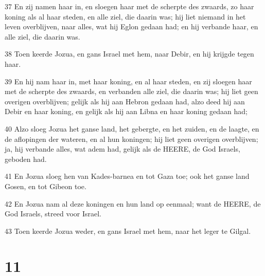 \par 37 En zij namen haar in, en sloegen haar met de scherpte des zwaards, zo haar koning als al haar steden, en alle ziel, die daarin was; hij liet niemand in het leven overblijven, naar alles, wat hij Eglon gedaan had; en hij verbande haar, en alle ziel, die daarin was.
\par 38 Toen keerde Jozua, en gans Israel met hem, naar Debir, en hij krijgde tegen haar.
\par 39 En hij nam haar in, met haar koning, en al haar steden, en zij sloegen haar met de scherpte des zwaards, en verbanden alle ziel, die daarin was; hij liet geen overigen overblijven; gelijk als hij aan Hebron gedaan had, alzo deed hij aan Debir en haar koning, en gelijk als hij aan Libna en haar koning gedaan had;
\par 40 Alzo sloeg Jozua het ganse land, het gebergte, en het zuiden, en de laagte, en de aflopingen der wateren, en al hun koningen; hij liet geen overigen overblijven; ja, hij verbande alles, wat adem had, gelijk als de HEERE, de God Israels, geboden had.
\par 41 En Jozua sloeg hen van Kades-barnea en tot Gaza toe; ook het ganse land Gosen, en tot Gibeon toe.
\par 42 En Jozua nam al deze koningen en hun land op eenmaal; want de HEERE, de God Israels, streed voor Israel.
\par 43 Toen keerde Jozua weder, en gans Israel met hem, naar het leger te Gilgal.

\chapter{11}

